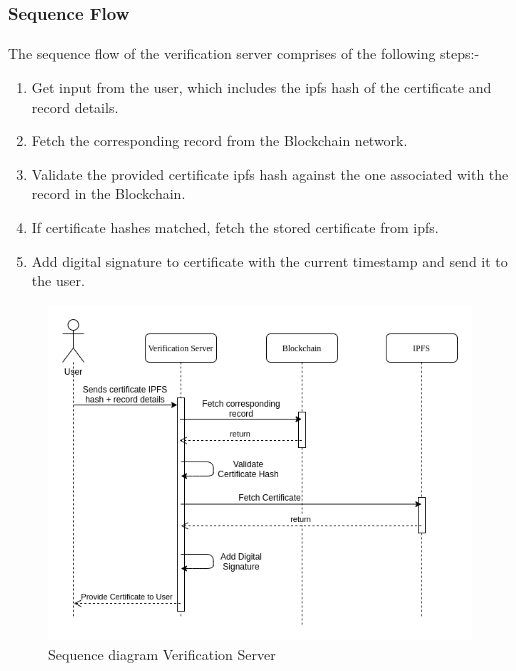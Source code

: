 \documentclass[12pt]{article}
\begin{document}
        \subsubsection{Sequence Flow}
        \paragraph{}
        The sequence flow of the verification server comprises of the following steps:-
        \begin{enumerate}
            \item Get input from the user, which includes the \acrshort{ipfs} hash of the certificate and record details.
            \item Fetch the corresponding record from the Blockchain network.
            \item Validate the provided certificate \acrshort{ipfs} hash against the one associated with the record in the Blockchain.
            \item If certificate hashes matched, fetch the stored certificate from \acrshort{ipfs}.
            \item Add digital signature to certificate with the current timestamp and send it to the user.
        \end{enumerate}
        
        \begin{figure}[H]
                \includegraphics[scale=0.5]{verification_seq.png}
                \centering
                \caption{Sequence diagram Verification Server}
        \end{figure}
        
\end{document}
